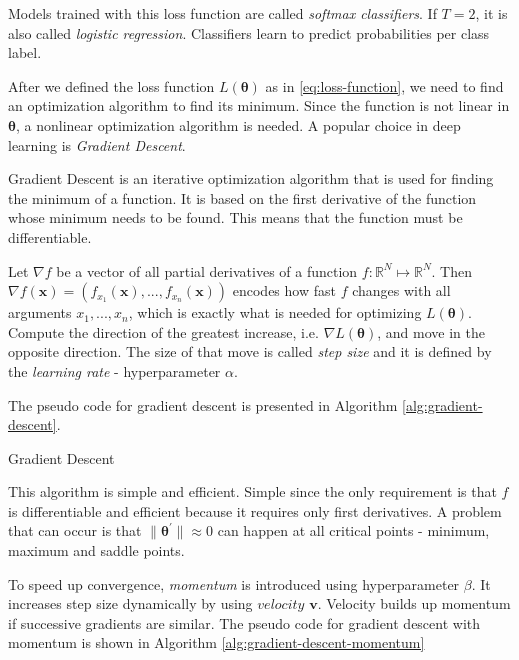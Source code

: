 Models trained with this loss function are called \textit{softmax classifiers}. If $T = 2$, it is also called \textit{logistic regression}. Classifiers learn to predict probabilities per class label.

After we defined the loss function $L(\pmb \theta)$  as in \ref{eq:loss-function}, we need to find an optimization algorithm to find its minimum. Since the function is not linear in $\pmb \theta$, a nonlinear optimization algorithm is needed. A popular choice in deep learning is \textit{Gradient Descent}.

Gradient Descent is an iterative optimization algorithm that is used for finding the minimum of a function. It is based on the first derivative of the function whose minimum needs to be found. This means that the function must be differentiable. 

Let $\nabla f$ be a vector of all partial derivatives of a function $f: \mathbb{R}^N \mapsto \mathbb{R}^N$. Then $\nabla f(\pmb x) = (f_{x_1}(\pmb x), ..., f_{x_n}(\pmb x))$  encodes how fast $f$ changes with all arguments $x_1, ..., x_n$, which is exactly what is needed for optimizing $L(\pmb \theta)$. Compute the direction of the greatest increase, i.e. $\nabla L(\pmb \theta)$, and move in the opposite direction. The size of that move is called \textit{step size} and it is defined by the \textit{learning rate} - hyperparameter $\alpha$.  

The pseudo code for gradient descent is presented in Algorithm \ref{alg:gradient-descent}.

\begin{algorithm}[htb]
\caption{Gradient Descent}
\label{alg:gradient-descent}


\end{algorithm}

This algorithm is simple and efficient. Simple since the only requirement is that $f$ is differentiable and efficient because it requires only first derivatives. A problem that can occur is that $\| \pmb \theta^{'}\|  \approx 0$ can happen at all critical points - minimum, maximum and saddle points.

To speed up convergence, \textit{momentum} is introduced using hyperparameter $\beta$. It increases step size dynamically by using $velocity$ $\pmb v$. Velocity builds up momentum if successive gradients are similar. The pseudo code for gradient descent with momentum is shown in Algorithm \ref{alg:gradient-descent-momentum}

